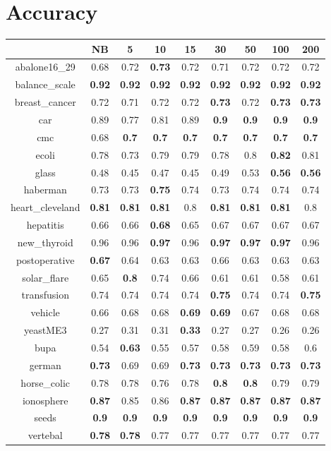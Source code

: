 \documentclass{article}%
\begin{document}
%
\normalsize%
\section*{Accuracy}%
\begin{tabular}{c|cccccccc}%
\hline%
&NB&5&10&15&30&50&100&200\\%
\hline%
abalone16\_29&0.68&0.72&\textbf{0.73}&0.72&0.71&0.72&0.72&0.72\\%
\hline%
balance\_scale&\textbf{0.92}&\textbf{0.92}&\textbf{0.92}&\textbf{0.92}&\textbf{0.92}&\textbf{0.92}&\textbf{0.92}&\textbf{0.92}\\%
\hline%
breast\_cancer&0.72&0.71&0.72&0.72&\textbf{0.73}&0.72&\textbf{0.73}&\textbf{0.73}\\%
\hline%
car&0.89&0.77&0.81&0.89&\textbf{0.9}&\textbf{0.9}&\textbf{0.9}&\textbf{0.9}\\%
\hline%
cmc&0.68&\textbf{0.7}&\textbf{0.7}&\textbf{0.7}&\textbf{0.7}&\textbf{0.7}&\textbf{0.7}&\textbf{0.7}\\%
\hline%
ecoli&0.78&0.73&0.79&0.79&0.78&0.8&\textbf{0.82}&0.81\\%
\hline%
glass&0.48&0.45&0.47&0.45&0.49&0.53&\textbf{0.56}&\textbf{0.56}\\%
\hline%
haberman&0.73&0.73&\textbf{0.75}&0.74&0.73&0.74&0.74&0.74\\%
\hline%
heart\_cleveland&\textbf{0.81}&\textbf{0.81}&\textbf{0.81}&0.8&\textbf{0.81}&\textbf{0.81}&\textbf{0.81}&0.8\\%
\hline%
hepatitis&0.66&0.66&\textbf{0.68}&0.65&0.67&0.67&0.67&0.67\\%
\hline%
new\_thyroid&0.96&0.96&\textbf{0.97}&0.96&\textbf{0.97}&\textbf{0.97}&\textbf{0.97}&0.96\\%
\hline%
postoperative&\textbf{0.67}&0.64&0.63&0.63&0.66&0.63&0.63&0.63\\%
\hline%
solar\_flare&0.65&\textbf{0.8}&0.74&0.66&0.61&0.61&0.58&0.61\\%
\hline%
transfusion&0.74&0.74&0.74&0.74&\textbf{0.75}&0.74&0.74&\textbf{0.75}\\%
\hline%
vehicle&0.66&0.68&0.68&\textbf{0.69}&\textbf{0.69}&0.67&0.68&0.68\\%
\hline%
yeastME3&0.27&0.31&0.31&\textbf{0.33}&0.27&0.27&0.26&0.26\\%
\hline%
bupa&0.54&\textbf{0.63}&0.55&0.57&0.58&0.59&0.58&0.6\\%
\hline%
german&\textbf{0.73}&0.69&0.69&\textbf{0.73}&\textbf{0.73}&\textbf{0.73}&\textbf{0.73}&\textbf{0.73}\\%
\hline%
horse\_colic&0.78&0.78&0.76&0.78&\textbf{0.8}&\textbf{0.8}&0.79&0.79\\%
\hline%
ionosphere&\textbf{0.87}&0.85&0.86&\textbf{0.87}&\textbf{0.87}&\textbf{0.87}&\textbf{0.87}&\textbf{0.87}\\%
\hline%
seeds&\textbf{0.9}&\textbf{0.9}&\textbf{0.9}&\textbf{0.9}&\textbf{0.9}&\textbf{0.9}&\textbf{0.9}&\textbf{0.9}\\%
\hline%
vertebal&\textbf{0.78}&\textbf{0.78}&0.77&0.77&0.77&0.77&0.77&0.77\\%
\hline%
\end{tabular}
\end{document}

